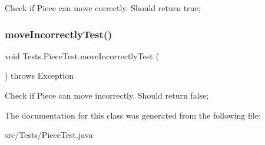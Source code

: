 Check if Piece can move correctly. Should return true; \mbox{\label{class_tests_1_1_piece_test_a8ddf1c5f3a0bdcfffb6d4f320359e116}} 
\subsubsection{\texorpdfstring{move\+Incorrectly\+Test()}{moveIncorrectlyTest()}}
{\footnotesize\ttfamily void Tests.\+Piece\+Test.\+move\+Incorrectly\+Test (\begin{DoxyParamCaption}{ }\end{DoxyParamCaption}) throws Exception\hspace{0.3cm}{\ttfamily [inline]}}

Check if Piece can move incorrectly. Should return false; 

The documentation for this class was generated from the following file\+:\begin{DoxyCompactItemize}
\item 
src/\+Tests/Piece\+Test.\+java\end{DoxyCompactItemize}
